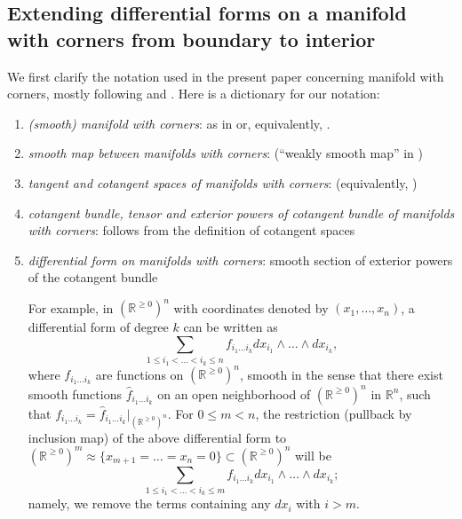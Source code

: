 \documentclass[11pt]{article}
\theoremstyle{definition}
\theoremstyle{remark}
\def\R{\mathbb{R}}
\begin{document}
\begin{appendices}
\section{Extending differential forms on a manifold with corners from boundary to interior}
\label{fromextension_appendix}

We first clarify the notation used in the present paper concerning manifold with corners, mostly following \cite{Hajek} and \cite{Joyce}. Here is a dictionary for our notation: 
\begin{enumerate}[label=$\cdot$]
\item {\it (smooth) manifold with corners}: as in \cite[page 3]{Joyce} or, equivalently, \cite[Definition 3]{Hajek}. 
\item {\it smooth map between manifolds with corners}: \cite[Definition 4]{Hajek} (``weakly smooth map'' in \cite[Definition 3.1]{Joyce})

\item {\it tangent and cotangent spaces of manifolds with corners}: \cite[Definition 10]{Hajek} (equivalently, \cite[Definition 2.2]{Joyce})

\item {\it cotangent bundle, tensor and exterior powers of cotangent bundle of manifolds with corners}: follows from the definition of cotangent spaces

\item {\it differential form on manifolds with corners}: smooth section of exterior powers of the cotangent bundle

For example, in $(\R^{\ge0})^n$ with coordinates denoted by $(x_1,\ldots,x_n)$, a differential form of degree $k$ can be written as 
$$\sum_{1\le i_1<\ldots<i_k\le n}f_{i_1\ldots i_k}dx_{i_1}\wedge\ldots\wedge dx_{i_k},$$
where $f_{i_1\ldots i_k}$ are functions on $(\R^{\ge0})^n$, smooth in the sense that there exist smooth functions $\hat{f}_{i_1\ldots i_k}$ on an open neighborhood of $(\R^{\ge0})^n$ in $\R^n$, such that $f_{i_1\ldots i_k}=\hat{f}_{i_1\ldots i_k}|_{(\R^{\ge0})^n}$. 
For $0\le m<n$, the restriction (pullback by inclusion map) of the above differential form to $(\R^{\ge0})^m\approx \{x_{m+1}=\ldots=x_n=0\}\subset(\R^{\ge0})^n$ will be 
$$\sum_{1\le i_1<\ldots<i_k\le m}f_{i_1\ldots i_k}dx_{i_1}\wedge\ldots\wedge dx_{i_k};$$
namely, we remove the terms containing any $dx_i$ with $i>m$. 


\end{enumerate}
\end{appendices}
\end{document}
